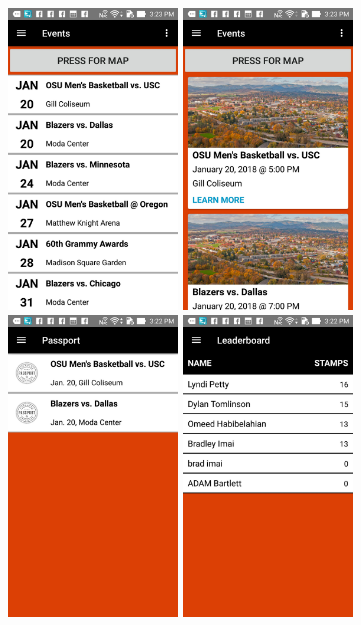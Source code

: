 \documentclass[onecolumn, draftclsnofoot,10pt, compsoc]{IEEEtran}
\begin{document}
		\includegraphics[height=8cm]{eventlistview}
		\includegraphics[height=8cm]{eventcardview}
		\includegraphics[height=8cm]{passport}
		\includegraphics[height=8cm]{leaderboard}
\end{document}
